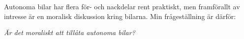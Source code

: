 Autonoma bilar har flera för- och nackdelar rent praktiskt, men framförallt av intresse är en moralisk diskussion kring bilarna. Min frågeställning är därför:

\textit{Är det moraliskt att tillåta autonoma bilar?}